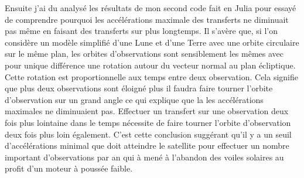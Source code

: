 \documentclass[12pt]{article} %
\begin{document}
		
		Ensuite j'ai du analysé les résultats de mon second code fait en Julia pour essayé de comprendre pourquoi les accélérations maximale des transferts ne diminuait pas même en faisant des transferts sur plus longtemps.
		Il s'avère que, si l'on considère un modèle simplifié d'une Lune et d'une Terre avec une orbite circulaire sur le même plan, les orbites d'observations sont sensiblement les mêmes avec pour unique différence une rotation autour du vecteur normal au plan écliptique. Cette rotation est proportionnelle aux temps entre deux observation. Cela signifie que plus deux observations sont éloigné plus il faudra faire tourner l'orbite d'observation sur un grand angle ce qui explique que la les accélérations maximales ne diminuaient pas. Effectuer un transfert sur une observation deux fois plus lointaine dans le temps nécessite de faire tourner l'orbite d'observation deux fois plus loin également. C'est cette conclusion suggérant qu'il y a un seuil d'accélérations minimal que doit atteindre le satellite pour effectuer un nombre important d'observations par an qui à mené à l'abandon des voiles solaires au profit d'un moteur à poussée faible.
		
\end{document}
